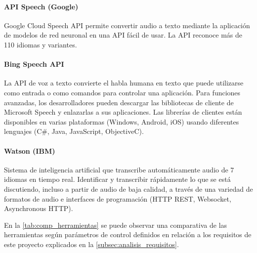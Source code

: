 \documentclass[../main.tex]{subfiles}
\begin{document}
\paragraph{API Speech (Google)}
Google Cloud Speech API permite convertir audio a texto mediante la aplicación de modelos de red neuronal en una API fácil de usar. La API reconoce más de 110 idiomas y variantes.\cite{}

\paragraph{Bing Speech API}
La API de voz a texto convierte el habla humana en texto que puede utilizarse como entrada o como comandos para controlar una aplicación. Para funciones avanzadas, los desarrolladores pueden descargar las bibliotecas de cliente de Microsoft Speech y enlazarlas a sus aplicaciones. Las librerías de clientes están disponibles en varias plataformas (Windows, Android, iOS) usando diferentes lenguajes (C\#, Java, JavaScript, ObjectiveC).\cite{}

\paragraph{Watson (IBM)}
Sistema de inteligencia artificial que transcribe automáticamente audio de 7 idiomas en tiempo real. Identificar y transcribir rápidamente lo que se está discutiendo, incluso a partir de audio de baja calidad, a través de una variedad de formatos de audio e interfaces de programación (HTTP REST, Websocket, Asynchronous HTTP).\cite{}



En la \autoref{tab:comp_herramientas} se puede observar una comparativa de las herramientas según parámetros de control definidos en relación a los requisitos de este proyecto explicados en la \autoref{subsec:analisis_requisitos}.
\end{document}
